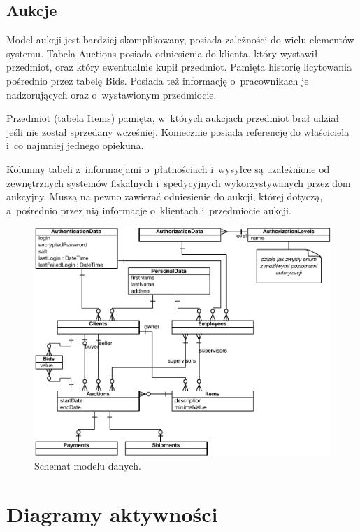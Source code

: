 \documentclass[10pt,a4paper]{article}
\newcommand{\s}[1]{\textsf{#1}}
\begin{document}
\subsection{Aukcje}

Model aukcji jest bardziej skomplikowany, posiada zależności do wielu elementów
systemu. Tabela \s{Auctions} posiada odniesienia do klienta, który wystawił
przedmiot, oraz który ewentualnie kupił przedmiot. Pamięta historię licytowania
pośrednio przez tabelę \s{Bids}. Posiada też informację o~pracownikach je
nadzorujących oraz o~wystawionym przedmiocie.

Przedmiot (tabela \s{Items}) pamięta, w~których aukcjach przedmiot brał udział
jeśli nie został sprzedany wcześniej. Koniecznie posiada referencję do
właściciela i~co najmniej jednego opiekuna.

Kolumny tabeli z~informacjami o~płatnościach i~wysyłce są uzależnione od
zewnętrznych systemów fiskalnych i~spedycyjnych wykorzystywanych przez dom
aukcyjny. Muszą na pewno zawierać odniesienie do aukcji, której dotyczą,
a~pośrednio przez nią informacje o~klientach i~przedmiocie aukcji.

\begin{figure}[p]
  \begin{adjustwidth}{-2cm}{-2cm}
    \centering
    \includegraphics{figury/model-danych}
    \caption{Schemat modelu danych.}
    \label{fig:model_danych}
  \end{adjustwidth}
\end{figure}

\section{Diagramy aktywności}
\end{document}
